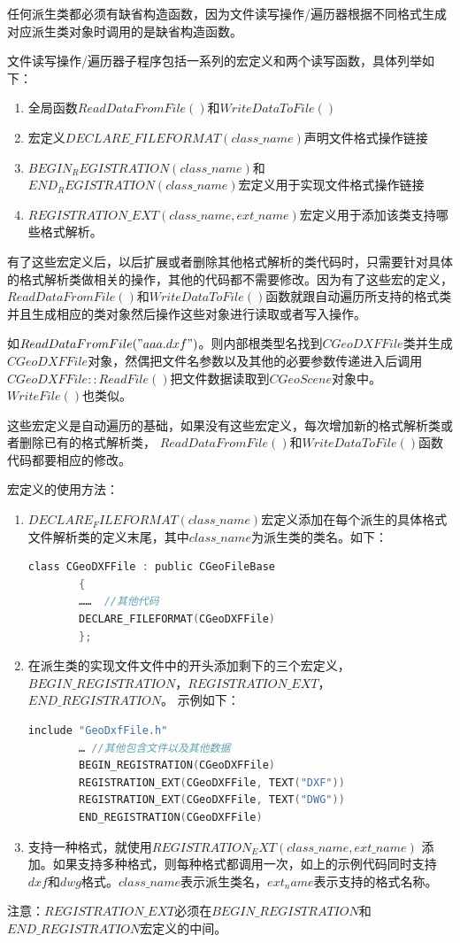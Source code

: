 任何派生类都必须有缺省构造函数，因为文件读写操作/遍历器根据不同格式生成对应派生类对象时调用的是缺省构造函数。

文件读写操作/遍历器子程序包括一系列的宏定义和两个读写函数，具体列举如下：
\begin{enumerate}
	\item 全局函数$ReadDataFromFile()$和$WriteDataToFile()$
	\item 宏定义$DECLARE\_FILEFORMAT(class\_name)$声明文件格式操作链接
	\item $BEGIN_REGISTRATION(class\_name)$和$END_REGISTRATION(class\_name)$宏定义用于实现文件格式操作链接
	\item $REGISTRATION\_EXT(class\_name,ext\_name)$宏定义用于添加该类支持哪些格式解析。
\end{enumerate}

有了这些宏定义后，以后扩展或者删除其他格式解析的类代码时，只需要针对具体的格式解析类做相关的操作，其他的代码都不需要修改。因为有了这些宏的定义，$ReadDataFromFile()$和$WriteDataToFile()$函数就跟自动遍历所支持的格式类并且生成相应的类对象然后操作这些对象进行读取或者写入操作。

如$ReadDataFromFile("aaa.dxf")$。则内部根类型名找到$CGeoDXFFile$类并生成$CGeoDXFFile$对象，然偶把文件名参数以及其他的必要参数传递进入后调用$CGeoDXFFile::ReadFile()$把文件数据读取到$CGeoScene$对象中。$WriteFile()$也类似。

这些宏定义是自动遍历的基础，如果没有这些宏定义，每次增加新的格式解析类或者删除已有的格式解析类， $ReadDataFromFile()$和$WriteDataToFile()$函数代码都要相应的修改。

宏定义的使用方法：
\begin{enumerate}
	\item $DECLARE_FILEFORMAT(class\_name)$宏定义添加在每个派生的具体格式文件解析类的定义末尾，其中$class\_name$为派生类的类名。如下：
	\begin{lstlisting}[language=C]
		class CGeoDXFFile : public CGeoFileBase
		{
		……  //其他代码
		DECLARE_FILEFORMAT(CGeoDXFFile)
		};
	\end{lstlisting}
	
	\item 
	在派生类的实现文件文件中的开头添加剩下的三个宏定义，
	$BEGIN\_REGISTRATION$，$REGISTRATION\_EXT$，$END\_REGISTRATION$。
	示例如下：
	\begin{lstlisting}[language=C]
		include "GeoDxfFile.h"
		… //其他包含文件以及其他数据
		BEGIN_REGISTRATION(CGeoDXFFile)
		REGISTRATION_EXT(CGeoDXFFile, TEXT("DXF"))
		REGISTRATION_EXT(CGeoDXFFile, TEXT("DWG"))
		END_REGISTRATION(CGeoDXFFile)
	\end{lstlisting}
	
	\item
	支持一种格式，就使用$REGISTRATION_EXT(class\_name,ext\_name)$ 添加。如果支持多种格式，则每种格式都调用一次，如上的示例代码同时支持$dxf$和$dwg$格式。$class\_name$表示派生类名，$ext_name$表示支持的格式名称。
\end{enumerate}
注意：$REGISTRATION\_EXT$必须在$BEGIN\_REGISTRATION$和$END\_REGISTRATION$宏定义的中间。

